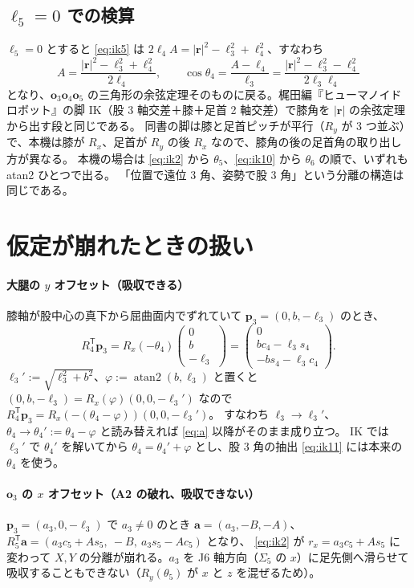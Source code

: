 \documentclass[a4paper,11pt]{ltjsarticle}
\newcommand{\Rx}{R_x}\newcommand{\Ry}{R_y}\newcommand{\Rz}{R_z}
\newcommand{\bp}{\boldsymbol{p}}\newcommand{\bo}{\boldsymbol{o}}\newcommand{\br}{\boldsymbol{r}}
\newcommand{\ba}{\boldsymbol{a}}\newcommand{\bw}{\boldsymbol{w}}\newcommand{\bq}{\boldsymbol{q}}
\newcommand{\vc}[3]{\begin{pmatrix}#1\\#2\\#3\end{pmatrix}}
\newcommand{\cs}[1]{c_{#1}}\newcommand{\sn}[1]{s_{#1}}
\newcommand{\T}{^{\mathsf T}}
\begin{document}
\subsection{$\ell_5=0$ での検算}
$\ell_5=0$ とすると \eqref{eq:ik5} は $2\ell_4A=|\br|^2-\ell_3^2+\ell_4^2$、すなわち
\begin{equation}
A=\frac{|\br|^2-\ell_3^2+\ell_4^2}{2\ell_4},\qquad
\cos\theta_4=\frac{A-\ell_4}{\ell_3}=\frac{|\br|^2-\ell_3^2-\ell_4^2}{2\ell_3\ell_4}
\end{equation}
となり、$\bo_3\bo_4\bo_5$ の三角形の余弦定理そのものに戻る。梶田編『ヒューマノイドロボット』の脚 IK（股 3 軸交差＋膝＋足首 2 軸交差）で膝角を $|\br|$ の余弦定理から出す段と同じである。
同書の脚は膝と足首ピッチが平行（$\Ry$ が 3 つ並ぶ）で、本機は膝が $\Rx$、足首が $\Ry$ の後 $\Rx$ なので、膝角の後の足首角の取り出し方が異なる。
本機の場合は \eqref{eq:ik2} から $\theta_5$、\eqref{eq:ik10} から $\theta_6$ の順で、いずれも atan2 ひとつで出る。
「位置で遠位 3 角、姿勢で股 3 角」という分離の構造は同じである。

\section{仮定が崩れたときの扱い}\label{sec:offsets}
\paragraph{大腿の $y$ オフセット（吸収できる）}
膝軸が股中心の真下から屈曲面内でずれていて $\bp_3=(0,b,-\ell_3)$ のとき、
\begin{equation}
R_4\T\bp_3=\Rx(-\theta_4)\vc{0}{b}{-\ell_3}=\vc{0}{b\cs4-\ell_3\sn4}{-b\sn4-\ell_3\cs4}.
\end{equation}
$\ell_3':=\sqrt{\ell_3^2+b^2}$、$\varphi:=\operatorname{atan2}(b,\ell_3)$ と置くと $(0,b,-\ell_3)=\Rx(\varphi)(0,0,-\ell_3')$ なので
$R_4\T\bp_3=\Rx(-(\theta_4-\varphi))(0,0,-\ell_3')$。
すなわち $\ell_3\to\ell_3'$、$\theta_4\to\theta_4':=\theta_4-\varphi$ と読み替えれば \eqref{eq:a} 以降がそのまま成り立つ。
IK では $\ell_3'$ で $\theta_4'$ を解いてから $\theta_4=\theta_4'+\varphi$ とし、股 3 角の抽出 \eqref{eq:ik11} には本来の $\theta_4$ を使う。

\paragraph{$\bo_3$ の $x$ オフセット（A2 の破れ、吸収できない）}
$\bp_3=(a_3,0,-\ell_3)$ で $a_3\ne0$ のとき $\ba=(a_3,-B,-A)$、$R_5\T\ba=(a_3\cs5+A\sn5,\ -B,\ a_3\sn5-A\cs5)$ となり、
\eqref{eq:ik2} が $r_x=a_3\cs5+A\sn5$ に変わって $X,Y$ の分離が崩れる。$a_3$ を J6 軸方向（$\Sigma_5$ の $x$）に足先側へ滑らせて吸収することもできない（$\Ry(\theta_5)$ が $x$ と $z$ を混ぜるため）。
\end{document}
